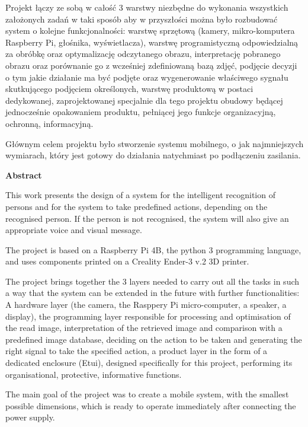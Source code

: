 \documentclass[a4paper,12pt,reqno]{article}
\begin{document}
Projekt łączy ze sobą w całość 3 warstwy niezbędne do wykonania wszystkich założonych zadań w taki sposób aby w przyszłości można było rozbudować system o kolejne funkcjonalności: warstwę sprzętową (kamery, mikro-komputera Raspberry Pi, głośnika, wyświetlacza), warstwę programistyczną odpowiedzialną za obróbkę oraz optymalizację odczytanego obrazu, interpretację pobranego obrazu oraz porównanie go z wcześniej zdefiniowaną bazą zdjęć, podjęcie decyzji o tym jakie działanie ma być podjęte oraz wygenerowanie właściwego sygnału skutkującego podjęciem określonych, warstwę produktową w postaci dedykowanej, zaprojektowanej specjalnie dla tego projektu obudowy będącej jednocześnie opakowaniem produktu, pełniącej jego funkcje organizacyjną, ochronną, informacyjną.

Głównym celem projektu było stworzenie systemu mobilnego, o jak najmniejszych wymiarach, który jest gotowy do działania natychmiast po podłączeniu zasilania.

%
%
\newpage
\begin{flushleft}
\Large \textbf{Abstract}
\end{flushleft}
\vspace{1cm}

This work presents the design of a system for the intelligent recognition of persons and for the system to take predefined actions, depending on the recognised person. If the person is not recognised, the system will also give an appropriate voice and visual message.

The project is based on a Raspberry Pi 4B, the python 3 programming language, and uses components printed on a Creality Ender-3 v.2 3D printer.

The project brings together the 3 layers needed to carry out all the tasks in such a way that the system can be extended in the future with further functionalities: A hardware layer (the camera, the Rasppery Pi micro-computer, a speaker, a display), the programming layer responsible for processing and optimisation of the read image, interpretation of the retrieved image and comparison with a predefined image database, deciding on the action to be taken and generating the right signal to take the specified action, a product layer in the form of a dedicated enclosure (Etui), designed specifically for this project, performing its organisational, protective, informative functions.

The main goal of the project was to create a mobile system, with the smallest possible dimensions, which is ready to operate immediately after connecting the power supply.
\end{document}
